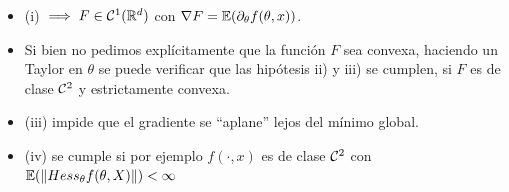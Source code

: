 \begin{remark}
\beforeitemize
\begin{itemize}
\item (i) $\implies F\in\mathcal{C}^1(\mathbb{R}^d)$ con  $\nabla F=\mathbb{E}(\partial_\theta f(\theta,x))$. 
     \item Si bien no pedimos explícitamente que la función $F$ sea  convexa, haciendo un Taylor en $\theta$ se puede verificar que las hipótesis ii) y iii) se cumplen, si  $F$ es  de clase ${\cal C}^2$ y estrictamente convexa. 
     \item (iii)  impide que el gradiente se ``aplane'' lejos del m\'inimo global. 
    \item (iv) se cumple si por ejemplo $f(\cdot,x)$ es  de clase ${\cal C}^2$ con  $\mathbb{E}(\|Hess_\theta f(\theta,X)\|)<\infty$ %
\end{itemize}
\end{remark}

